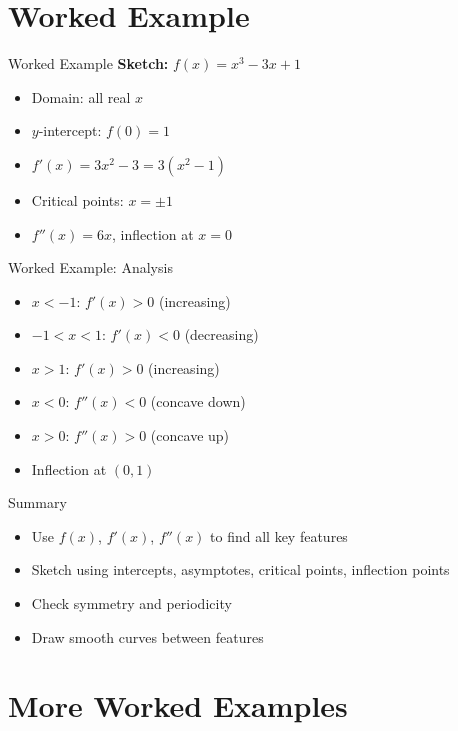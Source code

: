 \documentclass[aspectratio=169]{beamer}
\begin{document}
\section{Worked Example}

\begin{frame}{Worked Example}
\textbf{Sketch:} $f(x) = x^3 - 3x + 1$
\begin{itemize}
    \item Domain: all real $x$
    \item $y$-intercept: $f(0)=1$
    \item $f'(x) = 3x^2 - 3 = 3(x^2-1)$
    \item Critical points: $x=\pm1$
    \item $f''(x) = 6x$, inflection at $x=0$
\end{itemize}
\end{frame}

\begin{frame}{Worked Example: Analysis}
\begin{itemize}
    \item $x<-1$: $f'(x)>0$ (increasing)
    \item $-1<x<1$: $f'(x)<0$ (decreasing)
    \item $x>1$: $f'(x)>0$ (increasing)
    \item $x<0$: $f''(x)<0$ (concave down)
    \item $x>0$: $f''(x)>0$ (concave up)
    \item Inflection at $(0,1)$
\end{itemize}
\end{frame}

\begin{frame}{Summary}
\begin{itemize}
    \item Use $f(x)$, $f'(x)$, $f''(x)$ to find all key features
    \item Sketch using intercepts, asymptotes, critical points, inflection points
    \item Check symmetry and periodicity
    \item Draw smooth curves between features
\end{itemize}
\end{frame}

\section{More Worked Examples}
\end{document}

